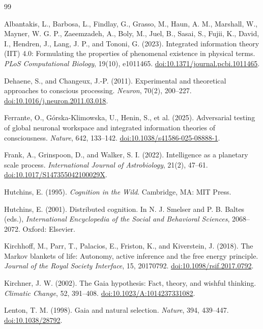 \documentclass[11pt]{article}
\begin{document}
\begin{thebibliography}{99}

Albantakis, L., Barbosa, L., Findlay, G., Grasso, M., Haun, A. M., Marshall, W., Mayner, W. G. P., Zaeemzadeh, A., Boly, M., Juel, B., Sasai, S., Fujii, K., David, I., Hendren, J., Lang, J. P., and Tononi, G. (2023). Integrated information theory (IIT) 4.0: Formulating the properties of phenomenal existence in physical terms. \emph{PLoS Computational Biology}, 19(10), e1011465. \href{https://doi.org/10.1371/journal.pcbi.1011465}{doi:10.1371/journal.pcbi.1011465}.

Dehaene, S., and Changeux, J.-P. (2011). Experimental and theoretical approaches to conscious processing. \emph{Neuron}, 70(2), 200--227. \href{https://doi.org/10.1016/j.neuron.2011.03.018}{doi:10.1016/j.neuron.2011.03.018}.

Ferrante, O., Górska-Klimowska, U., Henin, S., et al. (2025). Adversarial testing of global neuronal workspace and integrated information theories of consciousness. \emph{Nature}, 642, 133--142. \href{https://doi.org/10.1038/s41586-025-08888-1}{doi:10.1038/s41586-025-08888-1}.

Frank, A., Grinspoon, D., and Walker, S. I. (2022). Intelligence as a planetary scale process. \emph{International Journal of Astrobiology}, 21(2), 47--61. \href{https://doi.org/10.1017/S147355042100029X}{doi:10.1017/S147355042100029X}.

Hutchins, E. (1995). \emph{Cognition in the Wild}. Cambridge, MA: MIT Press.

Hutchins, E. (2001). Distributed cognition. In N. J. Smelser and P. B. Baltes (eds.), \emph{International Encyclopedia of the Social and Behavioral Sciences}, 2068--2072. Oxford: Elsevier.

Kirchhoff, M., Parr, T., Palacios, E., Friston, K., and Kiverstein, J. (2018). The Markov blankets of life: Autonomy, active inference and the free energy principle. \emph{Journal of the Royal Society Interface}, 15, 20170792. \href{https://doi.org/10.1098/rsif.2017.0792}{doi:10.1098/rsif.2017.0792}.

Kirchner, J. W. (2002). The Gaia hypothesis: Fact, theory, and wishful thinking. \emph{Climatic Change}, 52, 391--408. \href{https://doi.org/10.1023/A:1014237331082}{doi:10.1023/A:1014237331082}.

Lenton, T. M. (1998). Gaia and natural selection. \emph{Nature}, 394, 439--447. \href{https://doi.org/10.1038/28792}{doi:10.1038/28792}.


\end{thebibliography}
\end{document}
